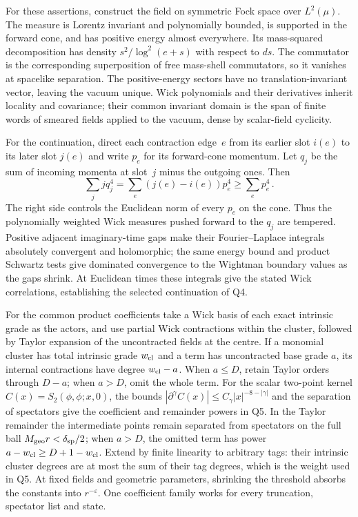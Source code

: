 For these assertions, construct the field on symmetric Fock space over $L^2(\mu)$. The measure is Lorentz invariant and polynomially bounded, is supported in the forward cone, and has positive energy almost everywhere. Its mass-squared decomposition has density $s^2/\log^2(e+s)$ with respect to $ds$. The commutator is the corresponding superposition of free mass-shell commutators, so it vanishes at spacelike separation. The positive-energy sectors have no translation-invariant vector, leaving the vacuum unique. Wick polynomials and their derivatives inherit locality and covariance; their common invariant domain is the span of finite words of smeared fields applied to the vacuum, dense by scalar-field cyclicity.

For the continuation, direct each contraction edge~$e$ from its earlier slot $i(e)$ to its later slot $j(e)$ and write $p_e$ for its forward-cone momentum. Let $q_j$ be the sum of incoming momenta at slot~$j$ minus the outgoing ones. Then
\begin{equation*}
\sum_j j q_j^4=\sum_e(j(e)-i(e))p_e^4\ge\sum_e p_e^4\,.
\end{equation*}
The right side controls the Euclidean norm of every $p_e$ on the cone. Thus the polynomially weighted Wick measures pushed forward to the $q_j$ are tempered. Positive adjacent imaginary-time gaps make their Fourier--Laplace integrals absolutely convergent and holomorphic; the same energy bound and product Schwartz tests give dominated convergence to the Wightman boundary values as the gaps shrink. At Euclidean times these integrals give the stated Wick correlations, establishing the selected continuation of Q4.

For the common product coefficients take a Wick basis of each exact intrinsic grade as the actors, and use partial Wick contractions within the cluster, followed by Taylor expansion of the uncontracted fields at the centre. If a monomial cluster has total intrinsic grade $w_{\rm cl}$ and a term has uncontracted base grade $a$, its internal contractions have degree $w_{\rm cl}-a$. When $a\le D$, retain Taylor orders through $D-a$; when $a>D$, omit the whole term. For the scalar two-point kernel $C(x)=S_2(\phi,\phi;x,0)$, the bounds $|\partial^\gamma C(x)|\le C_\gamma|x|^{-8-|\gamma|}$ and the separation of spectators give the coefficient and remainder powers in Q5. In the Taylor remainder the intermediate points remain separated from spectators on the full ball $M_{\rm geo}r<\delta_{\rm sp}/2$; when $a>D$, the omitted term has power $a-w_{\rm cl}\ge D+1-w_{\rm cl}$. Extend by finite linearity to arbitrary tags: their intrinsic cluster degrees are at most the sum of their tag degrees, which is the weight used in Q5. At fixed fields and geometric parameters, shrinking the threshold absorbs the constants into $r^{-\varepsilon}$. One coefficient family works for every truncation, spectator list and state.

